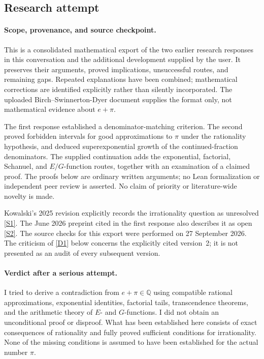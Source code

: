 \documentclass[11pt]{article}
\newcommand{\Q}{\mathbb Q}
\begin{document}
\subsection{Research attempt}

\paragraph{Scope, provenance, and source checkpoint.}
This is a consolidated mathematical export of the two earlier research
responses in this conversation and the additional development supplied by
the user. It preserves their arguments, proved implications, unsuccessful
routes, and remaining gaps. Repeated explanations have been combined;
mathematical corrections are identified explicitly rather than silently
incorporated. The uploaded Birch--Swinnerton-Dyer document supplies the
format only, not mathematical evidence about $e+\pi$.

The first response established a denominator-matching criterion. The second
proved forbidden intervals for good approximations to $\pi$ under the
rationality hypothesis, and deduced superexponential growth of the
continued-fraction denominators. The supplied continuation adds the
exponential, factorial, Schanuel, and $E/G$-function routes, together with
an examination of a claimed proof. The proofs below are ordinary written
arguments; no Lean formalization or independent peer review is asserted.
No claim of priority or literature-wide novelty is made.

Kowalski's 2025 revision explicitly records the irrationality question as
unresolved \href{https://arxiv.org/html/2311.00546v2}{[S1]}.
The June 2026 preprint cited in the first response also describes it as
open \href{https://arxiv.org/abs/2606.17303}{[S2]}.
The source checks for this export were performed on 27 September 2026.
The criticism of \href{https://arxiv.org/html/2007.15000v2}{[D1]} below
concerns the explicitly cited version~2; it is not presented as an audit
of every subsequent version.

\paragraph{Verdict after a serious attempt.}
I tried to derive a contradiction from $e+\pi\in\Q$ using compatible
rational approximations, exponential identities, factorial tails,
transcendence theorems, and the arithmetic theory of $E$- and $G$-functions.
I did not obtain an unconditional proof or disproof. What has been
established here consists of exact consequences of rationality and fully
proved sufficient conditions for irrationality. None of the missing
conditions is assumed to have been established for the actual number
$\pi$.
\end{document}
